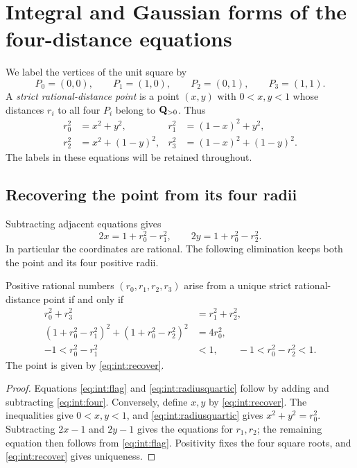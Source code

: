 \section{Integral and Gaussian forms of the four-distance equations}
\label{sec:integral}

We label the vertices of the unit square by
\[
 P_0=(0,0),\qquad P_1=(1,0),\qquad
 P_2=(0,1),\qquad P_3=(1,1).
\]
A \emph{strict rational-distance point} is a point $(x,y)$ with
$0<x,y<1$ whose distances $r_i$ to all four $P_i$ belong to
$\mathbf Q_{>0}$. Thus
\begin{equation}\label{eq:int:four}
\begin{aligned}
 r_0^2&=x^2+y^2,&r_1^2&=(1-x)^2+y^2,\\
 r_2^2&=x^2+(1-y)^2,&r_3^2&=(1-x)^2+(1-y)^2.
\end{aligned}
\end{equation}
The labels in these equations will be retained throughout.

\subsection{Recovering the point from its four radii}

Subtracting adjacent equations gives
\begin{equation}\label{eq:int:recover}
 2x=1+r_0^2-r_1^2,\qquad
 2y=1+r_0^2-r_2^2.
\end{equation}
In particular the coordinates are rational. The following elimination
keeps both the point and its four positive radii.

\begin{proposition}\label{prop:int:radius-model}
Positive rational numbers $(r_0,r_1,r_2,r_3)$ arise from a unique strict
rational-distance point if and only if
\begin{align}
 r_0^2+r_3^2&=r_1^2+r_2^2,\label{eq:int:flag}\\
 (1+r_0^2-r_1^2)^2+(1+r_0^2-r_2^2)^2&=4r_0^2,\label{eq:int:radiusquartic}\\
 -1<r_0^2-r_1^2&<1,\qquad
 -1<r_0^2-r_2^2<1.\label{eq:int:strict-radii}
\end{align}
The point is given by \eqref{eq:int:recover}.
\end{proposition}

\begin{proof}
Equations \eqref{eq:int:flag} and \eqref{eq:int:radiusquartic} follow
by adding and subtracting \eqref{eq:int:four}. Conversely, define $x,y$
by \eqref{eq:int:recover}. The inequalities give $0<x,y<1$, and
\eqref{eq:int:radiusquartic} gives $x^2+y^2=r_0^2$. Subtracting $2x-1$
and $2y-1$ gives the equations for $r_1,r_2$; the remaining equation
then follows from \eqref{eq:int:flag}. Positivity fixes the four square
roots, and \eqref{eq:int:recover} gives uniqueness.
\end{proof}

